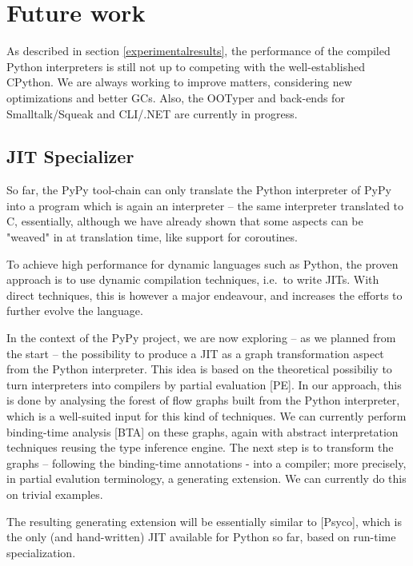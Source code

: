 \documentclass{acm_proc_article-sp}
\begin{document}
\section{Future work}
\label{futurework}


As described in section \ref{experimentalresults}, the performance of
the compiled Python interpreters is still not up to competing with the
well-established CPython.  We are always working to improve matters,
considering new optimizations and better GCs.  Also, the OOTyper and
back-ends for Smalltalk/Squeak and CLI/.NET are currently in progress.


\subsection{JIT Specializer}

So far, the PyPy tool-chain can only translate the Python interpreter of
PyPy into a program which is again an interpreter -- the same interpreter
translated to C, essentially, although we have already shown that some
aspects can be "weaved" in at translation time, like support for
coroutines.

To achieve high performance for dynamic languages such as Python, the
proven approach is to use dynamic compilation techniques, i.e.\ to write
JITs.  With direct techniques, this is however a major endeavour, and
increases the efforts to further evolve the language.

In the context of the PyPy project, we are now exploring -- as we planned
from the start -- the possibility to produce a JIT as a graph
transformation aspect from the Python interpreter.  This idea is based
on the theoretical possibiliy to turn interpreters into compilers by
partial evaluation [PE].  In our approach, this is done by analysing
the forest of flow graphs built from the Python interpreter, which is a
well-suited input for this kind of techniques.  We can currently perform
binding-time analysis [BTA] on these graphs, again with abstract
interpretation techniques reusing the type inference engine.  The next
step is to transform the graphs -- following the binding-time annotations
- into a compiler; more precisely, in partial evalution terminology, a
generating extension.  We can currently do this on trivial examples.

The resulting generating extension will be essentially similar to
[Psyco], which is the only (and hand-written) JIT available for Python so
far, based on run-time specialization.
\end{document}
